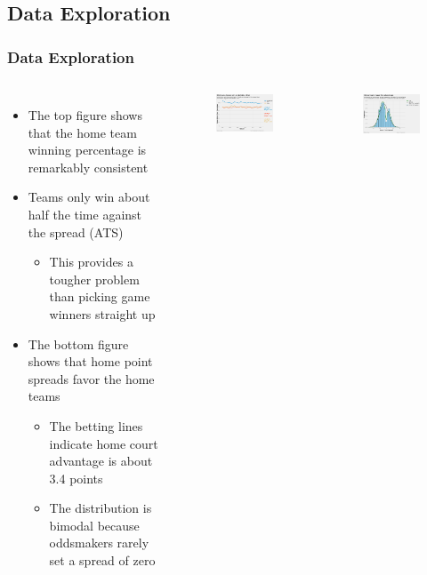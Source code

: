 \documentclass{beamer}
\begin{document}
\subsection{Data Exploration}
\begin{frame}
\frametitle{Data Exploration}
\begin{columns}
\begin{itemize}
    \item The top figure shows that the home team winning percentage is remarkably consistent
    \item Teams only win about half the time against the spread (ATS)
    \begin{itemize}
        \item This provides a tougher problem than picking game winners straight up
    \end{itemize}
    \item The bottom figure shows that home point spreads favor the home teams
    \begin{itemize}
        \item The betting lines indicate home court advantage is about 3.4 points
        \item The distribution is bimodal because oddsmakers rarely set a spread of zero
    \end{itemize}
\end{itemize}
\vspace{-0.5cm}
\begin{figure}
\includegraphics[width=60mm]{../docs/assets/images/data-exploration/home-win-pct.png}
\end{figure}
\vspace{-0.5cm}
\begin{figure}
\includegraphics[width=60mm]{../docs/assets/images/data-exploration/point-spread-distribution.png}
\end{figure}
\end{columns}
\end{frame}
\end{document}
